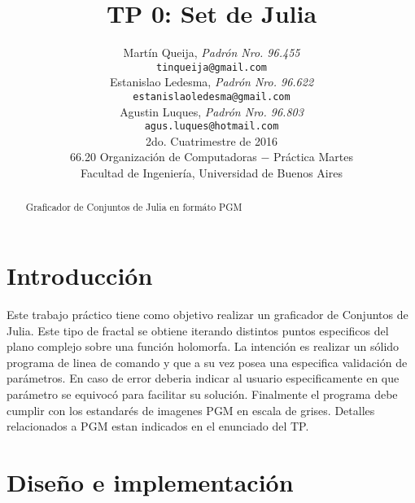 \documentclass[a4paper,10pt]{article}
\title{		\textbf{TP 0: Set de Julia}}
\author{	Martín Queija, \textit{Padrón Nro. 96.455}                     \\
            \texttt{ tinqueija@gmail.com }                                              \\[2.5ex]
            Estanislao Ledesma, \textit{Padrón Nro. 96.622}                     \\
            \texttt{ estanislaoledesma@gmail.com }                                              \\[2.5ex]
            Agustin Luques, \textit{Padrón Nro. 96.803}                     \\
            \texttt{ agus.luques@hotmail.com }                                              \\[2.5ex]
            \normalsize{2do. Cuatrimestre de 2016}                                      \\
            \normalsize{66.20 Organización de Computadoras  $-$ Práctica Martes}  \\
            \normalsize{Facultad de Ingeniería, Universidad de Buenos Aires}            \\
       }
\begin{document}
\maketitle
\thispagestyle{empty}   %


\begin{abstract}
\centerline{Graficador de Conjuntos de Julia en formáto PGM}

\end{abstract}
\newpage

\tableofcontents



\section{Introducción}

Este trabajo práctico tiene como objetivo realizar un graficador de Conjuntos de Julia. Este tipo de fractal se obtiene iterando distintos puntos especificos del plano complejo sobre una función holomorfa. La intención es realizar un sólido programa de linea de comando y que a su vez posea una especifica validación de parámetros. En caso de error deberia indicar al usuario especificamente en que parámetro se equivocó para facilitar su solución. Finalmente el programa debe cumplir con los estandarés de imagenes PGM en escala de grises. Detalles relacionados a PGM estan indicados en el enunciado del TP.


\section{Diseño e implementación}
\end{document}
